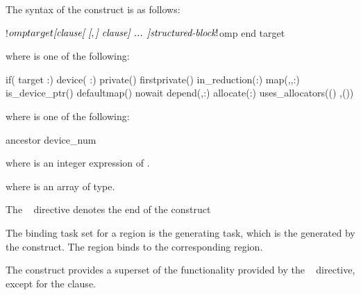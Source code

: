 \begin{samepage}
\smallskip
\begin{fortranspecific}
The syntax of the  construct is as follows:

\begin{ompfPragma}
!$omp target \plc{[clause[ [},\plc{] clause] ... ]}
    \plc{structured-block}
!$omp end target
\end{ompfPragma}

where  is one of the following:

\begin{indentedcodelist}
if(\plc{[} target :\plc{] scalar-logical-expression})
device(\plc{[ device-modifier} :\plc{] scalar-integer-expression})
private()
firstprivate()
in_reduction(:)
map(\plc{[[map-type-modifier[},\plc{] [map-type-modifier[},\plc{] ...] map-type}:\plc{ ] locator-list})
is_device_ptr()
defaultmap()
nowait
depend(\plc{[depend-modifier},\plc{] dependence-type }:)
allocate(\plc{[allocator}:\plc{]list})
uses_allocators(\plc{allocator[}()\plc{]}
	       \plc{[},\plc{allocator[}()\plc{] ...]})
\end{indentedcodelist}

where  is one of the following:
\begin{indentedcodelist}
ancestor
device_num
\end{indentedcodelist}

where  is an integer expression of  .

where  is an array of  type.

The ~ directive denotes the end of the  construct
\end{fortranspecific}

\end{samepage}

\binding
The binding task set for a  region is the
generating task, which is the  generated
by the  construct. The 
region binds to the corresponding  region.

\descr
The  construct provides a superset of the functionality
provided by the ~ directive, except for
the  clause.

